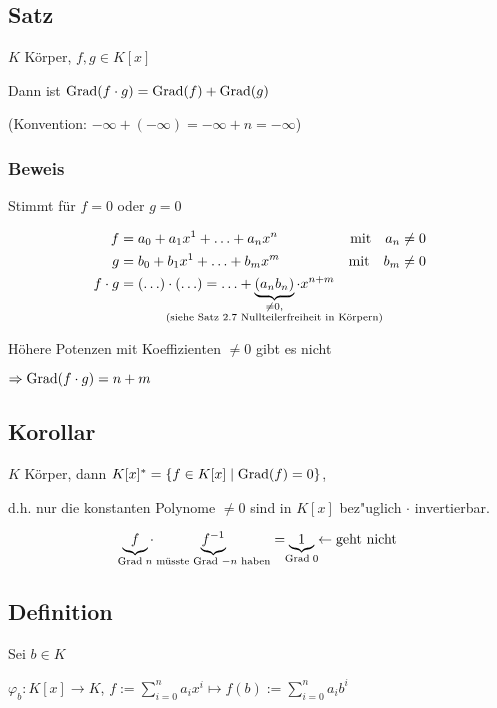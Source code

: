 \subsection{Satz}
\label{sub:satz}

$K$ Körper, $f,g \in K[x]$

Dann ist $\mathrm{ Grad }(f\cdot g) = \mathrm{ Grad }(f) + \mathrm{ Grad }(g)$

(Konvention: $-\infty + (-\infty) = -\infty + n = -\infty$)

\subsubsection*{Beweis}

	
	Stimmt für $f = 0$ oder $g = 0$
	
	\begin{align*}
		f &= a_0 + a_1x^1 + \ldots +  a_nx^n \quad &\text{mit} \quad  a_n \neq 0\\
		g &= b_0 + b_1x^1 + \ldots +  b_mx^m \quad &\text{mit} \quad  b_m \neq 0\\
		f \cdot g &= (\ldots) \cdot (\ldots) = \ldots + \underbrace{(a_nb_n)}_ {\mathclap{\substack{\neq 0, \\ \text{(siehe Satz 2.7
						Nullteilerfreiheit in Körpern)}}}}\cdot x^{n+m}
	\end{align*}
	
	
	Höhere Potenzen mit Koeffizienten $\neq 0$ gibt es nicht
	
	$\Rightarrow \mathrm{ Grad }(f \cdot g) = n + m$

\subsection{Korollar}

$K$ Körper, dann
$K[x]^* = \{f \in K[x]\; |\; \mathrm{ Grad }(f) = 0\}$,

d.h. nur die konstanten Polynome $\neq 0$ sind in $K[x]$ bez"uglich $\cdot$ invertierbar.

\[\underbrace{f}_{\mathclap{\Grad \;n}} \cdot \underbrace{f^{-1}}_{\text{müsste Grad $-n$ haben}} = \underbrace{1}_{\mathclap{\Grad \;0}} \leftarrow \text{geht nicht}\]

\subsection{Definition}


Sei $b \in K$

 $\varphi_b: K[x] \rightarrow K$, 
$f := \sum\limits_{i = 0}^n a_ix^i \mapsto f(b) := \sum\limits_{i = 0}^n a_ib^i$

